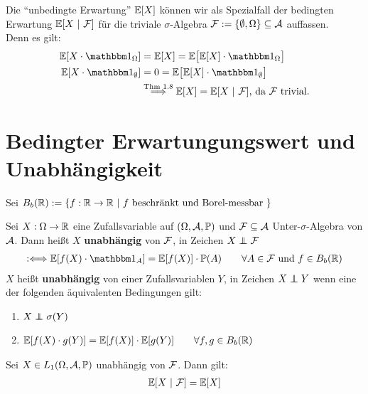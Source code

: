 \begin{bemerkung}
Die ``unbedingte Erwartung'' $\mathbb{E}[X]$ können wir als Spezialfall der bedingten Erwartung $\mathbb{E}[X~|~\mathcal{F}]$ für die triviale $\sigma$-Algebra $\mathcal{F}:=\lbrace\emptyset,\Omega\rbrace\subseteq\mathcal{A}$ auffassen.\\
Denn es gilt:
\begin{align*}
\E[X\cdot\indi_\Omega]&=\E[X]=\E\big[\E[X]\cdot\indi_\Omega\big]\\
\E[X\cdot\indi_\emptyset]&=0=\E\big[\E[X]\cdot\indi_\emptyset\big]\\
&\stackrel{\text{Thm 1.8}}{\Longrightarrow}
\E[X]=\E[X~|~\F]\text{, da $\F$ trivial.}
\end{align*}
\end{bemerkung}

\section*{Bedingter Erwartungungswert und Unabhängigkeit} %
Sei $B_b(\mathbb{R}):= \{f:\mathbb{R}\rightarrow\mathbb{R} ~|~f \text{ beschränkt und Borel-messbar }\}$
\begin{defi}
Sei $X:\Omega\to\mathbb{R}$ eine Zufallsvariable auf $(\Omega,\mathcal{A},\mathbb{P})$ und $\mathcal{F}\subseteq\mathcal{A}$ Unter-$\sigma$-Algebra von $\mathcal{A}$. Dann heißt $X$ \textbf{unabhängig} von $\mathcal{F}$, in Zeichen $X\unab\F$
\begin{align}\label{sigmaAlgebraUnabhaengig}
:\Longleftrightarrow
\E[f(X)\cdot\indi_A]
=
\E[f(X)]\cdot\P(A)\qquad\forall A\in\F\text{ und $f\in B_b(\R)$}
\end{align}
$X$ heißt \textbf{unabhängig} von einer Zufallsvariablen $Y$, in Zeichen $X\unab Y$ wenn eine der folgenden äquivalenten Bedingungen gilt:
\begin{enumerate}[label=(\alph*)]
\item $X\unab\sigma(Y)$
\item 
$\begin{aligned}
\mathbb{E}[f(X)\cdot g(Y)]
=
\mathbb{E}[f(X)]\cdot\mathbb{E}[g(Y)]\qquad\forall f,g\in B_b(\mathbb{R})
\end{aligned}$
\end{enumerate}
\end{defi}

\begin{theorem} %
Sei $X\in L_1(\Omega,\mathcal{A},\mathbb{P})$ unabhängig von $\mathcal{F}$. Dann gilt:
\begin{align*}
\mathbb{E}[X~|~\mathcal{F}]=\mathbb{E}[X]
\end{align*}
\end{theorem}

